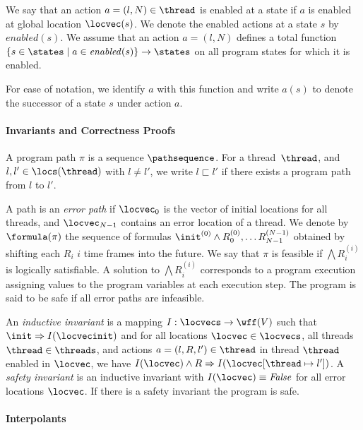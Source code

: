 \documentclass[conference]{IEEEtran}
\begin{document}
We say that an action $a=(l,N) \in \thread $ is enabled at a state if
$a$ is enabled at global location $\locvec(s)$.
We denote the enabled actions at a state $s$ by $\mathit{enabled}(s)$.
We assume that an action $a=(l,N)$ defines a total function
$
\{s \in \states \mid a \in \mathit{enabled}(s)\} \to \states
$
on all program states for which it is enabled.

For ease of notation, we identify $a$ with this function
and write $a(s)$ to denote the successor of a state $s$ under action $a$.

\paragraph*{Invariants and Correctness Proofs}

A program path $\pi$ is a sequence $\pathsequence$.
For a thread~$\thread$, and $l,l'\in \locs(\thread)$ with $l\neq l'$,
we write $l \sqsubset l'$ if there exists a program path
from $l$ to $l'$.

A path is an \emph{error path} if $\locvec_0$ is the vector of initial
locations for all threads, and $\locvec_{N-1}$ contains an error location of
a thread.  We denote by $\formula(\pi)$ the sequence of formulas
$\init^{(0)} \wedge R_0^{(0)}, \ldots R_{N-1}^{(N-1)}$ obtained by shifting
each $R_i$ $i$ time frames into the future.  We say that $\pi$ is feasible
if $\bigwedge R_i^{(i)}$ is logically satisfiable.  A solution to $\bigwedge
R_i^{(i)}$ corresponds to a program execution assigning values to the
program variables at each execution step.  The program is said to be safe if
all error paths are infeasible.

An \emph{inductive invariant} is a mapping $I:  \locvecs \to \wff(V)$ such that
%
$\init \Rightarrow I(\locvecinit)$
and for all locations $\locvec \in \locvecs$, all threads $\thread\in\threads$,
and actions $a=(l,R,l')\in \thread$ in thread $\thread$ enabled in $\locvec$,
we have $I(\locvec)\wedge R \Rightarrow I(\locvec[\thread\mapsto l'])$.
A \emph{safety invariant} is an inductive invariant with
$I(\locvec)\equiv \mathit{False}$ for all error locations $\locvec$.
If there is a safety invariant the program is safe.

\paragraph*{Interpolants}
\end{document}
